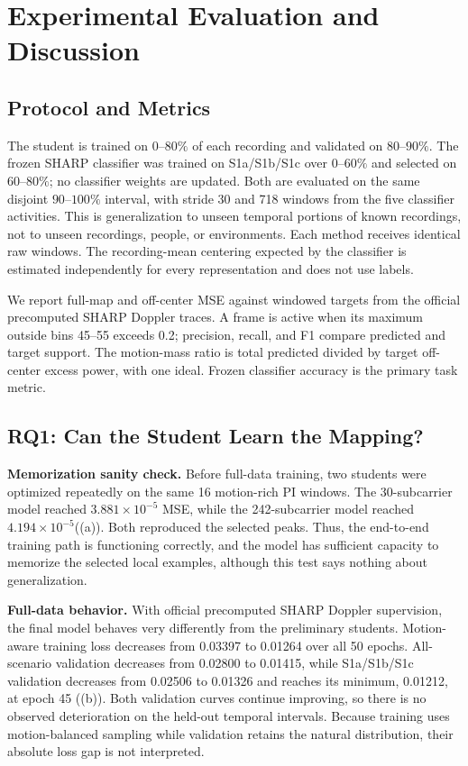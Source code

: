 \section{Experimental Evaluation and Discussion}
\label{sec:results}

\subsection{Protocol and Metrics}

The student is trained on \(0\)--\(80\%\) of each recording and validated on
\(80\)--\(90\%\). The frozen SHARP classifier was trained on S1a/S1b/S1c over
\(0\)--\(60\%\) and selected on \(60\)--\(80\%\); no classifier weights are
updated. Both are evaluated on the same disjoint \(90\)--\(100\%\) interval,
with stride 30 and 718 windows from the five classifier activities. This is
generalization to unseen temporal portions of known recordings, not to unseen
recordings, people, or environments. Each method receives identical raw
windows. The recording-mean centering expected by the classifier is estimated
independently for every representation and does not use labels.

We report full-map and off-center MSE against windowed targets from the official
precomputed SHARP Doppler traces. A frame is active when its maximum outside
bins 45--55 exceeds 0.2;
precision, recall, and F1 compare predicted and target support. The motion-mass
ratio is total predicted divided by target off-center excess power, with one
ideal. Frozen classifier accuracy is the primary task metric.

\subsection{RQ1: Can the Student Learn the Mapping?}

\textbf{Memorization sanity check.}
Before full-data training, two students were optimized repeatedly on the same
16 motion-rich PI windows. The 30-subcarrier model reached
\(3.881\times10^{-5}\) MSE, while the 242-subcarrier model reached
\(4.194\times10^{-5}\)((a)). Both reproduced the selected peaks. Thus, the end-to-end training path is functioning
correctly, and the model has sufficient capacity to memorize the selected local
examples, although this test says nothing about generalization.

\textbf{Full-data behavior.}
With official precomputed SHARP Doppler supervision, the final model behaves
very differently from the preliminary students. Motion-aware training loss decreases from
0.03397 to 0.01264 over all 50 epochs. All-scenario validation decreases from
0.02800 to 0.01415, while S1a/S1b/S1c validation decreases from 0.02506 to
0.01326 and reaches its minimum, 0.01212, at epoch 45 ((b)). Both validation curves
continue improving, so there is no observed deterioration on the held-out
temporal intervals. Because training uses motion-balanced sampling while
validation retains the natural distribution, their absolute loss gap is not
interpreted.

